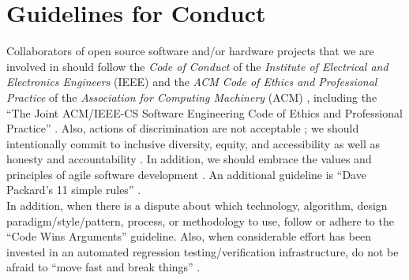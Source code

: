\documentclass[letter,12pt]{article}
\begin{document}
\section{Guidelines for Conduct}
\label{sec:GuidelinesforConduct}

Collaborators of open source software and/or hardware projects that we are involved in should follow the {\it Code of Conduct} of the {\it Institute of Electrical and Electronics Engineers} (IEEE) \cite{IEEE2014b,IEEE2014a,IEEE2014} and the {\it ACM Code of Ethics and Professional Practice} of the {\it Association for Computing Machinery} (ACM) \cite{Gotterbarn2018b,Gotterbarn2018a,Gotterbarn2018,Brinkman2016a,ACMCouncil1992,Brinkman2017,Brinkman2016,Wolf2016,Anderson1993}, including the ``The Joint {ACM/IEEE-CS} Software Engineering Code of Ethics and Professional Practice'' \cite{Gotterbarn1999,Gotterbarn1997}. Also, actions of discrimination are not acceptable \cite{IEEE2014c}; we should intentionally commit to inclusive diversity, equity, and accessibility \cite{Rich2022} as well as honesty \cite{Oluo2019,Delgado2017b,McCord2017,Molinsky2017,Reiner2016,Sandberg2014,Chang2013a,Gini2013,Rees2013,Sandberg2013,Stoker2013,Hanson2011,Maxwell2010,Lafair2009,Brach2004,Peterson2004,Putnam2000,Carnegie1936} and accountability \cite{Eitel2020,Gladwell2019,Doerr2018,ACMPublicPolicyOfficeStaff2017,Gentry2016,Molinaro2016,Fitzgerald2015,Shapiro2015a,Boehm2014,Cloud2013,Rees2013,Gary2012,Connors2011,Cushing2010,Carbajal2008,Forest2007,Godin2006,Wessner2003,Christian2020,PartnershipOnAIStaff2020,Sabeti2018,Rheem2017,TINYhrIncStaff2015,Stephens2013,Parker2012}. In addition, we should embrace the values and principles of agile software development \cite{Beedle2001a,Carter2019,Pescio1997}. An additional guideline is ``Dave Packard's 11 simple rules'' \cite{HewlettPackardCompany2012}. \\


In addition, when there is a dispute about which technology, algorithm, design paradigm/style/pattern, process, or methodology to use, follow or adhere to the ``Code Wins Arguments'' \cite{Kushner2011,Zuckerberg2012} guideline. Also, when considerable effort has been invested in an automated regression testing/verification infrastructure, do not be afraid to ``move fast and break things'' \cite{Fong2011,Evangelista2012}. \\
\end{document}
